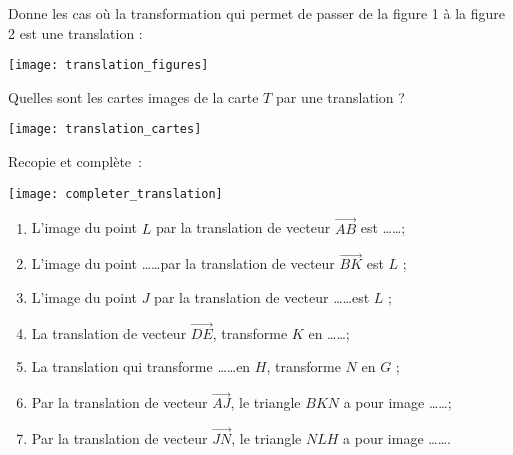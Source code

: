 

\begin{exercice}
Donne les cas où la transformation qui permet de passer de la figure 1 à la figure 2 est une translation :
\begin{center} \texttt{[image: translation\_figures]} \end{center}
\end{exercice}


\begin{exercice}
Quelles sont les cartes images de la carte $T$ par une translation ?
\begin{center} \texttt{[image: translation\_cartes]} \end{center}
\end{exercice}


\begin{exercice}
Recopie et complète :
\begin{center} \texttt{[image: completer\_translation]} \end{center}
\begin{enumerate}
 \item L’image du point $L$ par la translation de vecteur $\overrightarrow{AB}$ est \ldots \ldots ;
 \item L’image du point \ldots \ldots par la translation de vecteur $\overrightarrow{BK}$ est $L$ ;
 \item L’image du point $J$ par la translation de vecteur \ldots \ldots est $L$ ;
 \item La translation de vecteur $\overrightarrow{DE}$, transforme $K$ en \ldots \ldots ;
 \item La translation qui transforme \ldots \ldots en $H$, transforme $N$ en $G$ ;
 \item Par la translation de vecteur $\overrightarrow{AJ}$, le triangle $BKN$ a pour image \ldots \ldots ;
 \item Par la translation de vecteur $\overrightarrow{JN}$, le triangle $NLH$ a pour image \ldots \ldots.
 \end{enumerate}
\end{exercice}


